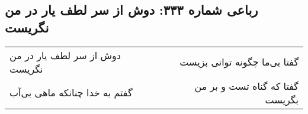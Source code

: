 \begin{center}
\section*{رباعی شماره ۳۳۳: دوش از سر لطف یار در من نگریست}
\label{sec:0333}
\begin{longtable}{l p{0.5cm} r}
دوش از سر لطف یار در من نگریست
&&
گفتا بی‌ما چگونه توانی بزیست
\\
گفتم به خدا چنانکه ماهی بی‌آب
&&
گفتا که گناه تست و بر من بگریست
\\
\end{longtable}
\end{center}
